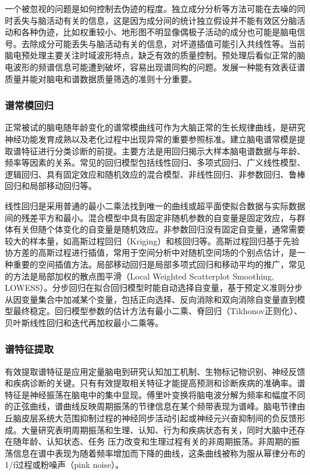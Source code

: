 一个被忽视的问题是如何控制去伪迹的程度。独立成分分析等方法可能在去噪的同时丢失与脑活动有关的信息，这是因为成分间的统计独立假设并不能有效区分脑活动和各种伪迹，比如权重较小、地形图不明显像偶极子活动的成分也可能是脑电信号。去除成分可能丢失与脑活动有关的信息，对坏道插值可能引入共线性等。当前脑电预处理主要关注时域波形特点，缺乏有效的质量控制。预处理后看似正常的脑电波形的频谱信息可能遭到破坏，容易出现谱同构的问题。发展一种能有效表征谱质量并能对脑电和谱数据质量筛选的准则十分重要。

\subsubsection{谱常模回归}
正常被试的脑电随年龄变化的谱常模曲线可作为大脑正常的生长规律曲线，是研究神经功能发育成熟以及老化过程中出现异常的重要参照标准。建立脑电谱常模是提取谱特征进行分类诊断的前提。主要方法是用回归揭示大样本脑电谱数据与年龄、频率等因素的关系。常见的回归模型包括线性回归、多项式回归、广义线性模型、逻辑回归、具有固定效应和随机效应的混合模型、非线性回归、非参数回归、鲁棒回归和局部移动回归等。

线性回归是采用普通的最小二乘法找到唯一的曲线或超平面使拟合数据与实际数据间的残差平方和最小。混合模型中具有固定非随机参数的自变量是固定效应，与群体有关但随个体变化的自变量是随机效应。非参数回归没有固定自变量，通常需要较大的样本量，如高斯过程回归（Kriging）和核回归等。高斯过程回归基于先验协方差的高斯过程进行插值，常用于空间分析中对随机空间场的个别点估计，是一种重要的空间插值方法。局部移动回归是局部多项式回归和移动平均的推广，常见的方法是局部加权的散点图平滑（Local Weighted Scatterplot Smoothing, LOWESS）。分步回归在拟合回归模型时能自动选择自变量，基于预定义准则分步从因变量集合中加减某个变量，包括正向选择、反向消除和双向消除自变量直到模型最终稳定。回归模型参数的估计方法有最小二乘、脊回归（Tikhonov正则化）、贝叶斯线性回归和迭代再加权最小二乘等。

\subsubsection{谱特征提取}
有效提取谱特征是应用定量脑电到研究认知加工机制、生物标记物识别、神经反馈和疾病诊断的关键。只有有效提取相关特征才能提高预测和诊断疾病的准确率。谱特征是神经振荡在脑电中的集中显现。傅里叶变换将脑电波分解为频率和幅度不同的正弦曲线，谱曲线反映周期振荡的节律信息在某个频带表现为谱峰。脑电节律由丘脑皮层系统大范围抑制过程的神经同步活动引起或神经元兴奋抑制间的负反馈形成。大量研究表明周期振荡和生理、认知、行为和疾病状态有关，同时大脑中还存在随年龄、认知状态、任务
压力改变和生理过程有关的非周期振荡。非周期的振荡信息在谱中表现为随着频率增加而下降的曲线，这条曲线被称为服从幂律分布的1/f过程或粉噪声（pink noise）。

